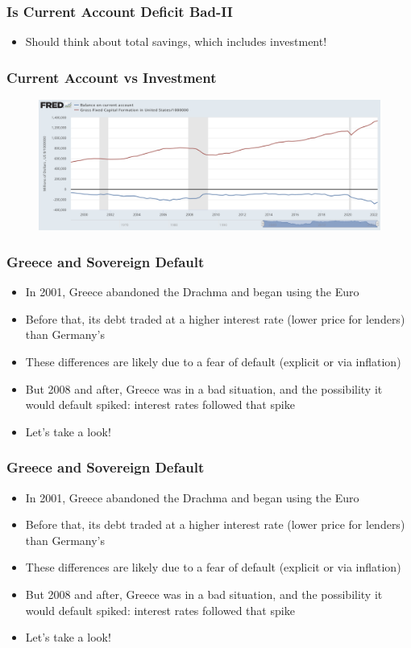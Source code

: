 \documentclass{beamer}
\begin{document}
\begin{frame}
\frametitle[alignment=center]{Is Current Account Deficit Bad-II}
\begin{itemize}
\item Should think about total savings, which includes investment!
\end{itemize}
\end{frame}

\begin{frame}
\frametitle[alignment=center]{Current Account vs Investment}
\begin{figure}
\centering
\includegraphics[scale=0.27]{Figures/CurrentAccount.png}
\end{figure}
\end{frame}

\begin{frame}
\frametitle[alignment=center]{Greece and Sovereign Default}
\begin{itemize}
\item In 2001, Greece abandoned the Drachma and began using the Euro
\bigskip
\item Before that, its debt traded at a higher interest rate (lower price for lenders) than Germany's
\bigskip
\item These differences are likely due to a fear of default (explicit or via inflation)
\bigskip
\item But 2008 and after, Greece was in a bad situation, and the possibility it would default spiked: interest rates followed that spike 
\bigskip
\item Let's take a look!
\end{itemize}
\end{frame}


\begin{frame}
\frametitle[alignment=center]{Greece and Sovereign Default}
\begin{itemize}
\item In 2001, Greece abandoned the Drachma and began using the Euro
\bigskip
\item Before that, its debt traded at a higher interest rate (lower price for lenders) than Germany's
\bigskip
\item These differences are likely due to a fear of default (explicit or via inflation)
\bigskip
\item But 2008 and after, Greece was in a bad situation, and the possibility it would default spiked: interest rates followed that spike 
\bigskip
\item Let's take a look!
\end{itemize}
\end{frame}
\end{document}
